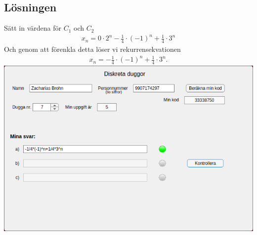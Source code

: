 \documentclass[a4paper,12pt]{article}
\begin{document}
\subsection*{Lösningen}
Sätt in värdena för $C_1$ och $C_2$
\begin{align}
    x_n = 0 \cdot 2^n - \frac{1}{4} \cdot (-1)^n + \frac{1}{4} \cdot 3^n
\end{align}
Och genom att förenkla detta löser vi rekurrensekvationen
\begin{align}
    x_n = -\frac{1}{4} \cdot (-1)^n + \frac{1}{4} \cdot 3^n.
\end{align}
%
\includegraphics[width=\textwidth]{x3onjw9.png}
%
\end{document}

